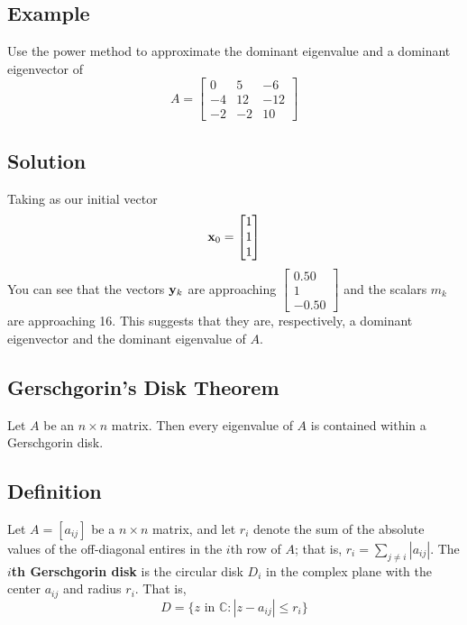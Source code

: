 \subsection*{Example}
Use the power method to approximate the dominant eigenvalue and a dominant eigenvector of
\[A=\begin{bmatrix}
        0  & 5  & -6  \\
        -4 & 12 & -12 \\
        -2 & -2 & 10
    \end{bmatrix}\]

\subsection*{Solution}
Taking as our initial vector
\[\mathbf{x}_0=\begin{bmatrix}
        1 \\1\\1
    \end{bmatrix}\]
You can see that the vectors $\mathbf{y}_k$ are approaching $\begin{bmatrix}
        0.50 \\ 1 \\ -0.50
    \end{bmatrix}$ and the scalars $m_k$ are approaching 16. This suggests that they are,
respectively, a dominant eigenvector and the dominant eigenvalue of $A$.

\subsection*{Gerschgorin's Disk Theorem}
Let $A$ be an $n\times n$ matrix. Then every eigenvalue of $A$ is contained within a Gerschgorin disk.

\subsection*{Definition}
Let $A=[a_{ij}]$ be a $n\times n$ matrix, and let $r_i$ denote the sum of the absolute
values of the off-diagonal entires in the $i$th row of $A$; that is, $r_i=\sum_{j\neq i}|a_{ij}|$.
The \textbf{$i$th Gerschgorin disk} is the circular disk $D_i$ in the complex plane
with the center $a_{ij}$ and radius $r_i$. That is,
\[D=\{z\text{ in }\mathbb{C}:|z-a_{ij}|\leq r_i\}\]